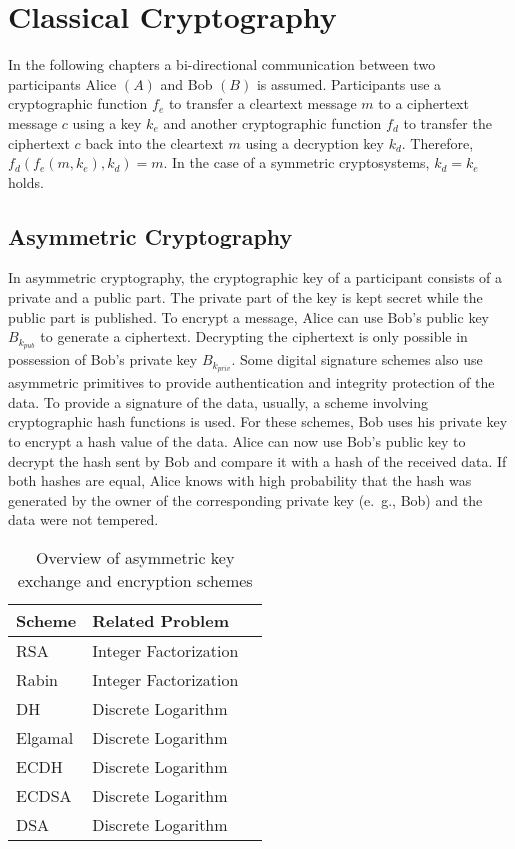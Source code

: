 \section{Classical Cryptography}


In the following chapters a bi-directional communication between two participants Alice \((A)\) and Bob \((B)\) is assumed. Participants use a cryptographic function \(f_e\) to transfer a cleartext message \(m\) to a ciphertext message \(c\) using a key \(k_e\) and another cryptographic function \(f_d\) to transfer the ciphertext \(c\) back into the cleartext \(m\) using a decryption key \(k_d\). Therefore, \(f_d(f_e(m,k_e),k_d) = m\). In the case of a symmetric cryptosystems, \(k_d = k_e\) holds.

\subsection{Asymmetric Cryptography}

In asymmetric cryptography, the cryptographic key of a participant consists of a private and a public part. The private part of the key is kept secret while the public part is published. To encrypt a message, Alice can use Bob's public key \(B_{k_{pub}}\) to generate a ciphertext. Decrypting the ciphertext is only possible in possession of Bob's private key \(B_{k_{priv}}\). Some digital signature schemes also use asymmetric primitives to provide authentication and integrity protection of the data. To provide a signature of the data, usually, a scheme involving cryptographic hash functions is used. For these schemes, Bob uses his private key to encrypt a hash value of the data. Alice can now use Bob's public key to decrypt the hash sent by Bob and compare it with a hash of the received data. If both hashes are equal, Alice knows with high probability that the hash was generated by the owner of the corresponding private key (e.~g., Bob) and the data were not tempered.

\begin{table}[t]
    \centering
    \caption{Overview of asymmetric key exchange and encryption schemes}

        \begin{tabular}{ l l c }
         \hline
         \textbf{Scheme} & \textbf{Related Problem} \\ 
         \hline
         \ac{RSA} &  Integer Factorization\\  
         Rabin &  Integer Factorization\\  
         \ac{DH} & Discrete Logarithm\\
         Elgamal & Discrete Logarithm \\
         \ac{ECDH} & Discrete Logarithm \\
         \ac{ECDSA} & Discrete Logarithm\\
         \ac{DSA} & Discrete Logarithm \\
    
        \end{tabular}
        \label{table:asymmetric_crypto_schemes}
\end{table}
    
